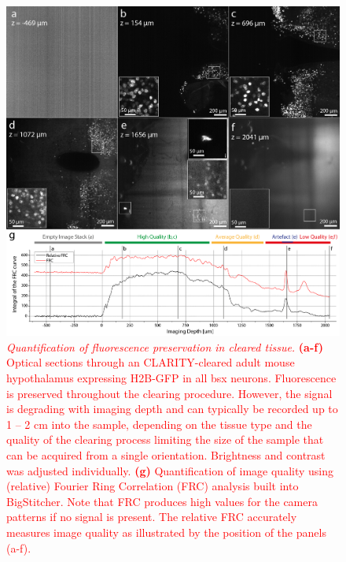 \documentclass[]{spie}  %
\def\red{\textcolor{red}}
\begin{document}
\begin{figure}[ht!]
\includegraphics[width=\textwidth]{fig-rf.png}
\vspace{-4.0mm}
\caption{\hspace{-0.5mm}\red{\emph{Quantification of fluorescence preservation in cleared tissue.} \textbf{(a-f)} Optical sections through an CLARITY-cleared adult mouse hypothalamus expressing H2B-GFP in all bsx neurons. Fluorescence is preserved throughout the clearing procedure. However, the signal is degrading with imaging depth and can typically be recorded up to 1 -- 2 cm into the sample, depending on the tissue type and the quality of the clearing process limiting the size of the sample that can be acquired from a single orientation. Brightness and contrast was adjusted individually. \textbf{(g)} Quantification of image quality using (relative) Fourier Ring Correlation (FRC) analysis built into BigStitcher. Note that FRC produces high values for the camera patterns if no signal is present. The relative FRC accurately measures image quality as illustrated by the position of the panels (a-f).} 
}
\label{fig:sup-fig-rf}
\end{figure}
\end{document}
